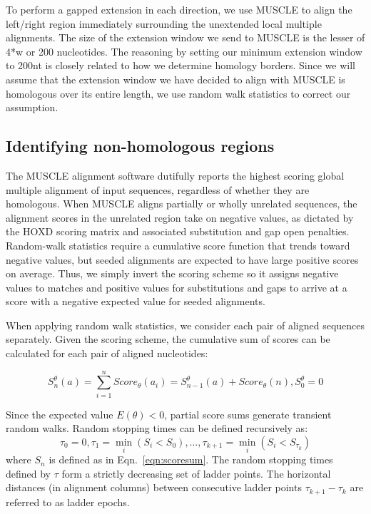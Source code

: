 \documentclass[twoside,11pt]{article}
\begin{document}
To perform a gapped extension in each direction, we use MUSCLE to align the left/right region immediately surrounding the unextended local multiple alignments. The size of the extension window we send to MUSCLE is the lesser of 4*w or 200 nucleotides. The reasoning by setting our minimum extension window to 200nt is closely related to how we determine homology borders. Since we will assume that the extension window we have decided to align with MUSCLE is homologous over its entire length, we use random walk statistics to correct our assumption.

\subsection{Identifying non-homologous regions}

The MUSCLE alignment software dutifully reports the highest scoring global multiple alignment of input sequences, regardless of whether they are homologous.  When MUSCLE aligns partially or wholly unrelated sequences, the alignment scores in the unrelated region take on negative values, as dictated by the HOXD scoring matrix and associated substitution and gap open penalties.  Random-walk statistics require a cumulative score function that trends toward negative values, but seeded alignments are expected to have large positive scores on average.  Thus, we simply invert the scoring scheme so it assigns negative values to matches and positive values for substitutions and gaps to arrive at a score with a negative expected value for seeded alignments.

When applying random walk statistics, we consider each pair of aligned sequences separately.  Given the scoring scheme, the cumulative sum of scores can be calculated for each pair of aligned nucleotides:

\begin{equation}
\label{eqn:scoresum}
S_n^\theta(a) = \sum_{i=1}^{n} Score_\theta(a_i) = S_{n-1}^\theta(a) + Score_\theta(n), S_0^\theta = 0
\end{equation}

Since the expected value $E(\theta) < 0$, partial score sums generate transient random walks.  Random stopping times can be defined recursively as:
\begin{equation}
\label{eqn:stoppingtimes}
\tau_0 = 0, \tau_1 = \min_i(S_i < S_0),\dots,\tau_{k+1} = \min_i(S_i < S_{\tau_k})
\end{equation}
where $S_n$ is defined as in Eqn.~\ref{eqn:scoresum}.  The random stopping times defined by $\tau$ form a strictly decreasing set of ladder points.  The horizontal distances (in alignment columns) between consecutive ladder points $\tau_{k+1}-\tau_{k}$ are referred to as ladder epochs.
\end{document}
